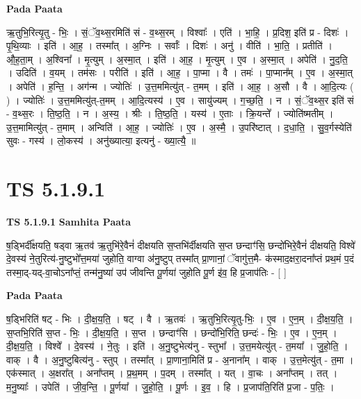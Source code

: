 \documentclass[17pt]{extarticle}
\begin{document}
\textbf{Pada Paata} \newline

ऋ॒तुभि॒रित्यृ॒तु - भिः॒ । सं॒ॅव॒थ्स॒रमिति॑ सं - व॒थ्स॒रम् । विश्वाः᳚ । एति॑ । भा॒हि॒ । प्र॒दिश॒ इति॑ प्र - दिशः॑ । पृ॒थि॒व्याः । इति॑ । आ॒ह॒ । तस्मा᳚त् । अ॒ग्निः । सर्वाः᳚ । दिशः॑ । अनु॑ । वीति॑ । भा॒ति॒ । प्रतीति॑ । औ॒ह॒ता॒म् । अ॒श्विना᳚ । मृ॒त्युम् । अ॒स्मा॒त् । इति॑ । आ॒ह॒ । मृ॒त्युम् । ए॒व । अ॒स्मा॒त् । अपेति॑ । नु॒द॒ति॒ । उदिति॑ । व॒यम् । तम॑सः । परीति॑ । इति॑ । आ॒ह॒ । पा॒प्मा । वै । तमः॑ । पा॒प्मान᳚म् । ए॒व । अ॒स्मा॒त् । अपेति॑ । ह॒न्ति॒ । अग॑न्म । ज्योतिः॑ । उ॒त्त॒ममित्यु॑त् - त॒मम् । इति॑ । आ॒ह॒ । अ॒सौ । वै । आ॒दि॒त्यः ( ) । ज्योतिः॑ । उ॒त्त॒ममित्यु॑त्-त॒मम् । आ॒दि॒त्यस्य॑ । ए॒व । सायु॑ज्यम् । ग॒च्छ॒ति॒ । न । सं॒ॅव॒थ्स॒र इति॑ सं - व॒थ्स॒रः । ति॒ष्ठ॒ति॒ । न । अ॒स्य॒ । श्रीः । ति॒ष्ठ॒ति॒ । यस्य॑ । ए॒ताः । क्रि॒यन्ते᳚ । ज्योति॑ष्मतीम् । उ॒त्त॒मामित्यु॑त् - त॒माम् । अन्विति॑ । आ॒ह॒ । ज्योतिः॑ । ए॒व । अ॒स्मै॒ । उ॒परि॑ष्टात् । द॒धा॒ति॒ । सु॒व॒र्गस्येति॑ सुवः - गस्य॑ । लो॒कस्य॑ । अनु॑ख्यात्या॒ इत्यनु॑ - ख्या॒त्यै॒ ॥  \newline




\section*{ TS 5.1.9.1 }

\textbf{TS 5.1.9.1 } \newline
\textbf{Samhita Paata} \newline

ष॒ड्भिर्दी᳚क्षयति॒ षड्वा ऋ॒तव॑ ऋ॒तुभि॑रे॒वैनं॑ दीक्षयति स॒प्तभि॑र्दीक्षयति स॒प्त छन्दाꣳ॑सि॒ छन्दो॑भिरे॒वैनं॑ दीक्षयति॒ विश्वे॑ दे॒वस्य॑ ने॒तुरित्य॑-नु॒ष्टुभो᳚त्त॒मया॑ जुहोति॒ वाग्वा अ॑नु॒ष्टुप् तस्मा᳚त् प्रा॒णानां॒ ॅवागु॑त्त॒मै- क॑स्माद॒क्षरा॒दना᳚प्तं प्रथ॒मं प॒दं तस्मा॒द्-यद्-वा॒चोऽना᳚प्तं॒ तन्म॑नु॒ष्या॑ उप॑ जीवन्ति पू॒र्णया॑ जुहोति पू॒र्ण इ॑व॒ हि प्र॒जाप॑तिः - [  ] \newline

\textbf{Pada Paata} \newline

ष॒ड्भिरिति॑ षट् - भिः । दी॒क्ष॒य॒ति॒ । षट् । वै । ऋ॒तवः॑ । ऋ॒तुभि॒रित्यृ॒तु-भिः॒ । ए॒व । ए॒न॒म् । दी॒क्ष॒य॒ति॒ । स॒प्तभि॒रिति॑ स॒प्त - भिः॒ । दी॒क्ष॒य॒ति॒ । स॒प्त । छन्दाꣳ॑सि । छन्दो॑भि॒रिति॒ छन्दः॑ - भिः॒ । ए॒व । ए॒न॒म् । दी॒क्ष॒य॒ति॒ । विश्वे᳚ । दे॒वस्य॑ । ने॒तुः । इति॑ । अ॒नु॒ष्टुभेत्य॑नु - स्तुभा᳚ । उ॒त्त॒मयेत्यु॑त् - त॒मया᳚ । जु॒हो॒ति॒ । वाक् । वै । अ॒नु॒ष्टुबित्य॑नु - स्तुप् । तस्मा᳚त् । प्रा॒णाना॒मिति॑ प्र - अ॒नाना᳚म् । वाक् । उ॒त्त॒मेत्यु॑त् - त॒मा । एक॑स्मात् । अ॒क्षरा᳚त् । अना᳚प्तम् । प्र॒थ॒मम् । प॒दम् । तस्मा᳚त् । यत् । वा॒चः । अना᳚प्तम् । तत् । म॒नु॒ष्याः᳚ । उपेति॑ । जी॒व॒न्ति॒ । पू॒र्णया᳚ । जु॒हो॒ति॒ । पू॒र्णः । इ॒व॒ । हि । प्र॒जाप॑ति॒रिति॑ प्र॒जा - प॒तिः॒ ।  \newline
\end{document}
